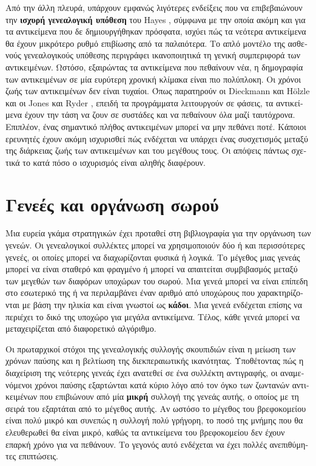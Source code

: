 \begin{greek}
Από την άλλη πλευρά, υπάρχουν εμφανώς λιγότερες ενδείξεις
που να επιβεβαιώνουν την \textbf{ισχυρή γενεαλογική υπόθεση}
του Hayes \cite{DBLP:conf/oopsla/Hayes91}, σύμφωνα με την
οποία ακόμη και για τα αντικείμενα που δε δημιουργήθηκαν
πρόσφατα, ισχύει πώς τα νεότερα αντικείμενα θα έχουν μικρότερο
ρυθμό επιβίωσης από τα παλαιότερα. Το απλό μοντέλο της ασθενούς
γενεαλογικούς υπόθεσης περιγράφει ικανοποιητικά τη γενική
συμπεριφορά των αντικειμένων. Ωστόσο, εξαιρώντας τα αντικείμενα
που πεθαίνουν νέα, η δημογραφία των αντικειμένων σε μία
ευρύτερη χρονική κλίμακα είναι πιο πολύπλοκη. Οι χρόνοι
ζωής των αντικειμένων δεν είναι τυχαίοι. Όπως παρατηρούν
οι Dieckmann και H{\"o}lzle \cite{DBLP:conf/ecoop/DieckmannH99}
και οι Jones και Ryder \cite{DBLP:conf/iwmm/JonesR08}, επειδή
τα προγράμματα λειτουργούν σε φάσεις, τα αντικείμενα έχουν
την τάση να ζουν σε συστάδες και να πεθαίνουν όλα μαζί
ταυτόχρονα. Επιπλέον, ένας σημαντικό πλήθος αντικειμένων μπορεί
να μην πεθάνει ποτέ. Κάποιοι ερευνητές έχουν ακόμη ισχυρισθεί
πώς ενδέχεται να υπάρχει ένας συσχετισμός μεταξύ της διάρκειας
ζωής των αντικειμένων και του μεγέθους τους. Οι απόψεις πάντως
\cite{DBLP:conf/oopsla/CaudillW86, DBLP:conf/oopsla/UngarJ88,
DBLP:conf/pldi/BarrettZ93} σχετικά το κατά πόσο ο ισχυρισμός
είναι αληθής διαφέρουν.

\section{Γενεές και οργάνωση σωρού}
Μια ευρεία γκάμα στρατηγικών έχει προταθεί στη βιβλιογραφία για την οργάνωση των
γενεών. Οι γενεαλογικοί συλλέκτες μπορεί να χρησιμοποιούν δύο ή και περισσότερες
γενεές, οι οποίες μπορεί να διαχωρίζονται φυσικά ή λογικά. Το μέγεθος μιας γενεάς
μπορεί να είναι σταθερό και φραγμένο ή μπορεί να απαιτείται συμβιβασμός μεταξύ των 
μεγεθών των διαφόρων υποχώρων του σωρού. Μια γενεά μπορεί να είναι επίπεδη στο
εσωτερικό της ή να περιλαμβάνει έναν αριθμό από υποχώρους που χαρακτηρίζονται
με βάση την ηλικία και είναι γνωστοί ως \textbf{κάδοι}. Μια γενεά ενδέχεται
επίσης να περιέχει το δικό της υποχώρο για μεγάλα αντικείμενα. Τέλος, κάθε γενεά
μπορεί να μεταχειρίζεται από διαφορετικό αλγόριθμο.

Οι πρωταρχικοί στόχοι της γενεαλογικής συλλογής σκουπιδιών είναι η μείωση των
χρόνων παύσης και η βελτίωση της διεκπεραιωτικής ικανότητας. Υποθέτοντας πώς η
διαχείριση της νεότερης γενεάς έχει ανατεθεί σε ένα συλλέκτη αντιγραφής, οι αναμενόμενοι
χρόνοι παύσης εξαρτώνται κατά κύριο λόγο από τον όγκο των ζωντανών αντικειμένων
που επιβιώνουν από μία \textbf{μικρή} συλλογή της γενεάς αυτής, ο οποίος
με τη σειρά του εξαρτάται από το μέγεθος αυτής. Αν ωστόσο το μέγεθος του βρεφοκομείου
είναι πολύ μικρό και συνεπώς η συλλογή πολύ γρήγορη, το ποσό της μνήμης που θα 
ελευθερωθεί θα είναι μικρό, καθώς τα αντικείμενα του βρεφοκομείου δεν έχουν
επαρκή χρόνο για να πεθάνουν. Το γεγονός αυτό ενδέχεται να έχει πολλές ανεπιθύμητες
επιπτώσεις. 


\end{greek}
